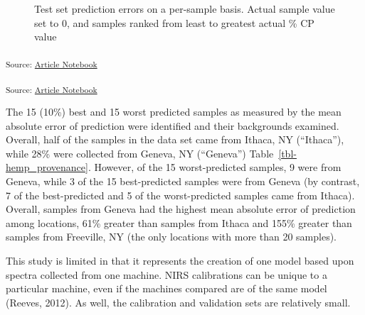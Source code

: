\documentclass[
]{agujournal2019}
\begin{document}
\label{cell-fig-validation_set_performance}
\begin{figure}[H]


\caption{\label{fig-validation_set_performance}Test set prediction
errors on a per-sample basis. Actual sample value set to 0, and samples
ranked from least to greatest actual \% CP value}

\end{figure}%

\textsubscript{Source:
\href{https://rvcrawford.github.io/glowing-system/index.qmd.html}{Article
Notebook}}

\textsubscript{Source:
\href{https://rvcrawford.github.io/glowing-system/index.qmd.html}{Article
Notebook}}

The 15 (10\%) best and 15 worst predicted samples as measured by the
mean absolute error of prediction were identified and their backgrounds
examined. Overall, half of the samples in the data set came from Ithaca,
NY (``Ithaca''), while 28\% were collected from Geneva, NY (``Geneva'')
Table~\ref{tbl-hemp_provenance}. However, of the 15 worst-predicted
samples, 9 were from Geneva, while 3 of the 15 best-predicted samples
were from Geneva (by contrast, 7 of the best-predicted and 5 of the
worst-predicted samples came from Ithaca). Overall, samples from Geneva
had the highest mean absolute error of prediction among locations, 61\%
greater than samples from Ithaca and 155\% greater than samples from
Freeville, NY (the only locations with more than 20 samples).

This study is limited in that it represents the creation of one model
based upon spectra collected from one machine. NIRS calibrations can be
unique to a particular machine, even if the machines compared are of the
same model (Reeves, 2012). As well, the calibration and validation sets
are relatively small.
\end{document}
